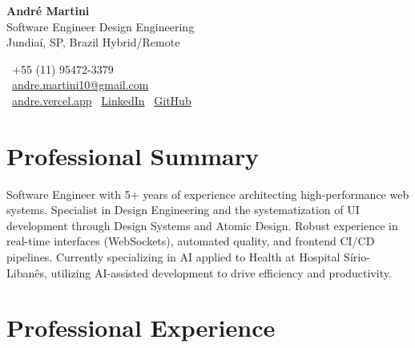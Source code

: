 \documentclass[10pt,a4paper]{article}
\begin{document}
\noindent
\begin{minipage}[t]{0.6\textwidth}
  {\Huge \textbf{André Martini}} \\
  \vspace{4pt}
  {\large\color{darkgray} Software Engineer \textbar{} Design Engineering} \\
  \vspace{2pt}
  {\color{gray} Jundiaí, SP, Brazil \textbar{} Hybrid/Remote}
\end{minipage}%
\begin{minipage}[t]{0.4\textwidth}
  \raggedleft
  \small
  \faPhone*~+55 (11) 95472-3379 \\
  \vspace{2pt}
  \faEnvelope~\href{mailto:andre.martini10@gmail.com}{andre.martini10@gmail.com} \\
  \vspace{2pt}
  \faGlobe~\href{https://andre.vercel.app}{andre.vercel.app} \textbar{}
  \faLinkedin~\href{https://www.linkedin.com/in/martiniandre}{LinkedIn} \textbar{}
  \faGithub~\href{https://github.com/martiniandre}{GitHub}
\end{minipage}

\vspace{10pt}

\section{Professional Summary}
Software Engineer with 5+ years of experience architecting high-performance web systems. Specialist in Design Engineering and the systematization of UI development through Design Systems and Atomic Design. Robust experience in real-time interfaces (WebSockets), automated quality, and frontend CI/CD pipelines. Currently specializing in AI applied to Health at Hospital Sírio-Libanês, utilizing AI-assisted development to drive efficiency and productivity.

\section{Professional Experience}
\end{document}
